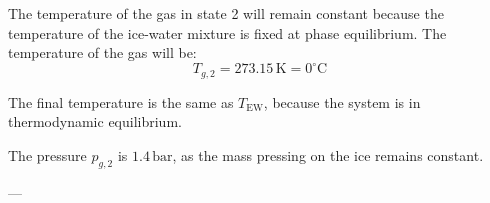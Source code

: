 The temperature of the gas in state 2 will remain constant because the temperature of the ice-water mixture is fixed at phase equilibrium. The temperature of the gas will be:  
\[
T_{g,2} = 273.15 \, \text{K} = 0^\circ\text{C}
\]

The final temperature is the same as \( T_{\text{EW}} \), because the system is in thermodynamic equilibrium.

The pressure \( p_{g,2} \) is \( 1.4 \, \text{bar} \), as the mass pressing on the ice remains constant.

---